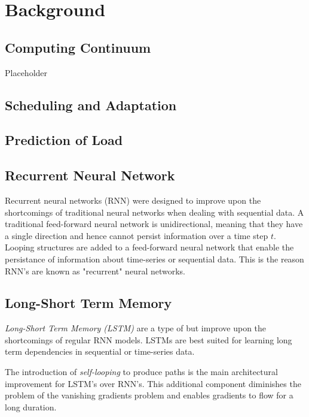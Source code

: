 \chapter{Background}
\label{ch:background}

    \section{Computing Continuum}
    \label{sec:computing-continuum-background}

        Placeholder

    \section{Scheduling and Adaptation}
    \label{sec:scheduling-and-adaptation-background}

    \section{Prediction of Load}
    \label{sec:prediction-of-load-background}

    \section{Recurrent Neural Network}
    \label{sec:rnn-background}

        Recurrent neural networks (RNN) were designed to improve upon the shortcomings of traditional neural networks when dealing with sequential data.
        A traditional feed-forward neural network is unidirectional, meaning that they have a single direction and hence cannot persist information over a time step $t$.
        Looping structures are added to a feed-forward neural network that enable the persistance of information about time-series or sequential data. 
        This is the reason RNN's are known as "recurrent" neural networks.


    \section{Long-Short Term Memory}
    \label{sec:lstm-background}

        \emph{Long-Short Term Memory (LSTM)} are a type of  but improve upon the shortcomings of regular RNN models.
        LSTMs are best suited for learning long term dependencies in sequential or time-series data.

        The introduction of \emph{self-looping} to produce paths is the main architectural improvement for LSTM's over RNN's. This additional component diminishes the problem of the vanishing gradients problem and enables gradients to flow for a long duration.